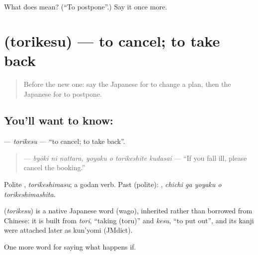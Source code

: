 \begin{tcolorbox}[breakable,colback=teal!4,colframe=teal!35!black,title={Before you move on}]
What does  mean? (\textquotedblleft{}To postpone\textquotedblright{}.) Say it once more.
\end{tcolorbox}
\section[\texorpdfstring{\ja{とりけす} (torikesu)}{とりけす (torikesu)}]{ (torikesu) — to cancel; to take back}

\label{lesson:JA-C345-torikesu}



\begin{quote}
Before the new one: say the Japanese for to change a plan, then the Japanese for to postpone.
\end{quote}

\subsection*{You'll want to know: }
\textbf{} — \emph{torikesu} — \textquotedblleft{}to cancel; to take back\textquotedblright{}.

\begin{quote}
\textbf{   } — \emph{byōki ni nattara, yoyaku o torikeshite kudasai} — \textquotedblleft{}If you fall ill, please cancel the booking.\textquotedblright{}
\end{quote}

Polite \textbf{}, \emph{torikeshimasu}; a godan verb. Past (polite): \textbf{  }, \emph{chichi ga yoyaku o torikeshimashita}.

\begin{cousinweb}
\textbf{} (\emph{torikesu}) is a native Japanese word (wago), inherited rather than borrowed from Chinese: it is built from \emph{tori}, \textquotedblleft{}taking (toru)\textquotedblright{} and \emph{kesu}, \textquotedblleft{}to put out\textquotedblright{}, and its kanji were attached later as kun'yomi (JMdict).
\end{cousinweb}

\begin{grammarlens}[title={What you've built}]
One more word for saying what happens if.
\end{grammarlens}

